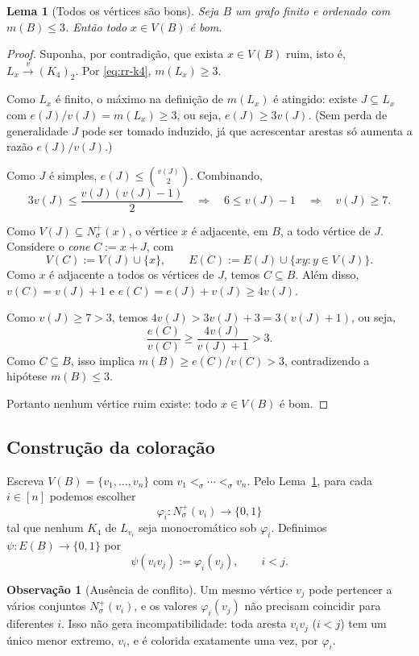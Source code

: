 \documentclass[reqno, 12pt]{amsart}
\numberwithin{equation}{section}
\theoremstyle{plain}
\newtheorem{lemma}[theorem]{Lema}
\theoremstyle{definition}
\newtheorem{remark}[theorem]{Observação}
\begin{document}
\begin{lemma}[Todos os vértices são bons]
  \label{lem:todos-bons}
  Seja $B$ um grafo finito e ordenado com $m(B)\leq 3$. Então todo
  $x\in V(B)$ é bom.
\end{lemma}

\begin{proof}
  Suponha, por contradição, que exista $x\in V(B)$ ruim, isto é,
  $L_x\xrightarrow{v}(K_4)_2$. Por \eqref{eq:rr-k4}, $m(L_x)\geq 3$.

  Como $L_x$ é finito, o máximo na definição de $m(L_x)$ é atingido:
  existe $J\subseteq L_x$ com $e(J)/v(J)=m(L_x)\geq 3$, ou seja,
  $e(J)\geq 3v(J)$. (Sem perda de generalidade $J$ pode ser tomado
  induzido, já que acrescentar arestas só aumenta a razão
  $e(J)/v(J)$.)

  Como $J$ é simples, $e(J)\leq\binom{v(J)}{2}$. Combinando,
  \[
    3v(J)\leq\frac{v(J)(v(J)-1)}{2}
    \quad\Longrightarrow\quad
    6\leq v(J)-1
    \quad\Longrightarrow\quad
    v(J)\geq 7.
  \]

  Como $V(J)\subseteq N_\sigma^+(x)$, o vértice $x$ é adjacente, em
  $B$, a todo vértice de $J$. Considere o \emph{cone} $C:=x+J$, com
  \[
    V(C):=V(J)\cup\{x\},\qquad
    E(C):=E(J)\cup\{xy: y\in V(J)\}.
  \]
  Como $x$ é adjacente a todos os vértices de $J$, temos $C\subseteq
    B$. Além disso, $v(C)=v(J)+1$ e $e(C)=e(J)+v(J)\geq 4v(J)$.

  Como $v(J)\geq 7>3$, temos $4v(J)>3v(J)+3=3(v(J)+1)$, ou seja,
  \[
    \frac{e(C)}{v(C)}\geq\frac{4v(J)}{v(J)+1}>3.
  \]
  Como $C\subseteq B$, isso implica $m(B)\geq e(C)/v(C)>3$,
  contradizendo a hipótese $m(B)\leq 3$.

  Portanto nenhum vértice ruim existe: todo $x\in V(B)$ é bom.
\end{proof}

\subsection{Construção da coloração}

Escreva $V(B)=\{v_1,\ldots,v_n\}$ com $v_1<_\sigma\cdots<_\sigma v_n$.
Pelo Lema~\ref{lem:todos-bons}, para cada $i\in[n]$ podemos escolher
\[
  \varphi_i:N_\sigma^+(v_i)\longrightarrow\{0,1\}
\]
tal que nenhum $K_4$ de $L_{v_i}$ seja monocromático sob $\varphi_i$.
Definimos $\psi:E(B)\to\{0,1\}$ por
\[
  \psi(v_iv_j):=\varphi_i(v_j),\qquad i<j.
\]

\begin{remark}[Ausência de conflito]
  Um mesmo vértice $v_j$ pode pertencer a vários conjuntos
  $N_\sigma^+(v_i)$, e os valores $\varphi_i(v_j)$ não precisam
  coincidir para diferentes $i$. Isso não gera incompatibilidade:
  toda aresta $v_iv_j$ ($i<j$) tem um único menor extremo, $v_i$, e é
  colorida exatamente uma vez, por $\varphi_i$.
\end{remark}
\end{document}
